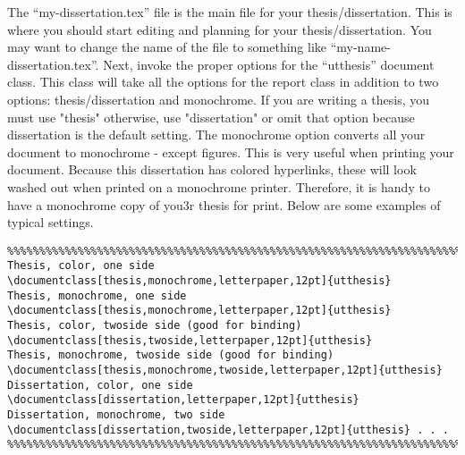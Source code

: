 The ``my-dissertation.tex'' file is the main file for your thesis/dissertation. This is where you should start editing and planning for your thesis/dissertation. You may want to change the name of the file to something like ``my-name-dissertation.tex''. Next, invoke the proper options for the ``utthesis'' document class. This class will take all the options for the report class in addition to two options: thesis/dissertation and monochrome. If you are writing a thesis, you must use "thesis" otherwise, use "dissertation" or omit that option because dissertation is the default setting. The monochrome option converts all your document to monochrome - except figures. This is very useful when printing your document. Because this dissertation has colored hyperlinks, these will look washed out when printed on a monochrome printer. Therefore, it is handy to have a monochrome copy of you3r thesis for print. Below are some examples of typical settings.
\begin{verbatim}
%%%%%%%%%%%%%%%%%%%%%%%%%%%%%%%%%%%%%%%%%%%%%%%%%%%%%%%%%%%%%%%%%%%%%%%%%%%
Thesis, color, one side
\documentclass[thesis,monochrome,letterpaper,12pt]{utthesis}
Thesis, monochrome, one side
\documentclass[thesis,monochrome,letterpaper,12pt]{utthesis}
Thesis, color, twoside side (good for binding)
\documentclass[thesis,twoside,letterpaper,12pt]{utthesis}
Thesis, monochrome, twoside side (good for binding)
\documentclass[thesis,monochrome,twoside,letterpaper,12pt]{utthesis}
Dissertation, color, one side
\documentclass[dissertation,letterpaper,12pt]{utthesis}
Dissertation, monochrome, two side
\documentclass[dissertation,twoside,letterpaper,12pt]{utthesis} . . .
%%%%%%%%%%%%%%%%%%%%%%%%%%%%%%%%%%%%%%%%%%%%%%%%%%%%%%%%%%%%%%%%%%%%%%%%%%%
\end{verbatim}

